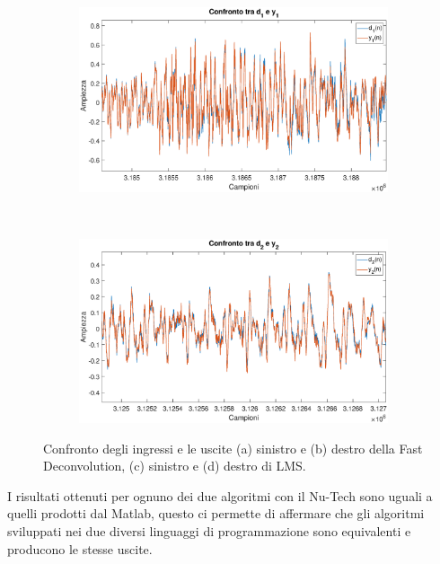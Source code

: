 \documentclass[12pt,a4paper,titlepage]{article}
\begin{document}
\begin{figure}[h]
	\ContinuedFloat
	\centering
	\begin{subfigure}{1\textwidth}
		\includegraphics[width=1\textwidth]{Immagini/d1_y1_LMS}
		\caption{}
		\label{fig:d1_y1_LMS}
	\end{subfigure}\\
	\begin{subfigure}{1\textwidth}
		\includegraphics[width=1\textwidth]{Immagini/d2_y2_LMS}
		\caption{}
		\label{fig:d2_y2_LMS}
	\end{subfigure}
	\caption{Confronto degli ingressi e le uscite (a) sinistro e (b) destro della Fast Deconvolution, (c) sinistro e (d) destro di LMS.}
	\label{fig:confronto_ingressi_uscite_LMS_FD}
\end{figure}

I risultati ottenuti per ognuno dei due algoritmi con il Nu-Tech sono uguali a quelli prodotti dal Matlab, questo ci permette di affermare che gli algoritmi sviluppati nei due diversi linguaggi di programmazione sono equivalenti e producono le stesse uscite.
\clearpage
\end{document}
